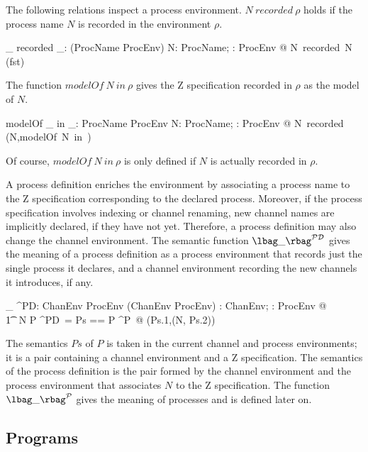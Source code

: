 \documentclass{article}
\begin{document}
The following relations inspect a process environment.  $N\ recorded\
\rho$ holds if the process name $N$ is recorded in the environment
$\rho$.
\begin{axdef}
  \_ recorded \_: \power (ProcName \times ProcEnv)
  \where %
  \forall N: ProcName; \rho: ProcEnv @ N\ recorded\ \rho \iff N \in
  \ran (\rho \comp fst)
\end{axdef}
The function $modelOf\ N\ in\ \rho$ gives the Z specification recorded
in $\rho$ as the model of $N$.
\begin{axdef}
  modelOf \_ in \_: ProcName \times ProcEnv \pfun
  \where %
  \forall N: ProcName; \rho: ProcEnv @ N\ recorded\ \rho \implies
  (N,modelOf\ N\ \rho) \in \ran \rho
\end{axdef}
Of course, $modelOf\ N\ in\ \rho$ is only defined if $N$ is actually
recorded in $\rho$.

A process definition enriches the environment by associating a process
name to the Z specification corresponding to the declared process.
Moreover, if the process specification involves indexing or channel
renaming, new channel names are implicitly declared, if they have not
yet.  Therefore, a process definition may also change the channel
environment.  The semantic function \mbox{$\lbag\_ \rbag^{\cal PD} $}
gives the meaning of a process definition as a process environment
that records just the single process it declares, and a channel
environment recording the new channels it introduces, if any.
\begin{zed}
  \lbag\_ \rbag^{\cal PD}:  \pfun ChanEnv
  \pfun ProcEnv \pfun (ChanEnv \times ProcEnv)
  \also %
  \forall \gamma: ChanEnv; \rho: ProcEnv @
  \\ %
  \t1 \lbag \circprocess\ N  P \rbag^{\cal PD}\gamma\ \rho = \LET
  Ps == \lbag P \rbag^{\cal P}\gamma\ \rho @ (Ps.1,\langle (N,
  Ps.2)\rangle)
\end{zed}
The semantics $Ps$ of $P$ is taken in the current channel and process
environments; it is a pair containing a channel environment and a Z
specification.  The semantics of the process definition is the pair
formed by the channel environment and the process environment that
associates $N$ to the Z specification.  The function \mbox{$\lbag\_
  \rbag^{\cal P}$} gives the meaning of processes and is defined later
on.

\subsection{Programs}
\end{document}
